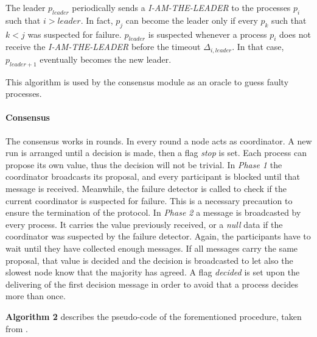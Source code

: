 \documentclass[a4paper]{article}
\begin{document}
The leader $p_{leader}$ periodically sends a \emph{I-AM-THE-LEADER} to the processes $p_i$ such that $i > leader$. In fact, $p_j$ can become the leader only if every $p_k$ such that $k < j$ was suspected for failure. $p_{leader}$ is suspected whenever a process $p_i$ does not receive the \emph{I-AM-THE-LEADER} before the timeout $\Delta_{i, leader}$. In that case, $p_{leader + 1}$ eventually becomes the new leader.

This algorithm is used by the consensus module as an oracle to guess faulty processes.

\paragraph{Consensus}

The consensus works in rounds. In every round a node acts as coordinator. A new run is arranged until a decision is made, then a flag \emph{stop} is set.
Each process can propose its own value, thus the decision will not be trivial. In \emph{Phase 1} the coordinator broadcasts its proposal, and every participant is blocked until that message is received. Meanwhile, the failure detector is called to check if the current coordinator is suspected for failure. This is a necessary precaution to ensure the termination of the protocol.
In \emph{Phase 2} a message is broadcasted by every process. It carries the value previously received, or a \emph{null} data if the coordinator was suspected by the failure detector. Again, the participants have to wait until they have collected enough messages. If all messages carry the same proposal, that value is decided and the decision is broadcasted to let also the slowest node know that the majority has agreed.
A flag \emph{decided} is set upon the delivering of the first decision message in order to avoid that a process decides more than once.

\textbf{Algorithm 2} describes the pseudo-code of the forementioned procedure, taken from \cite{fdconsensus}.
\end{document}
